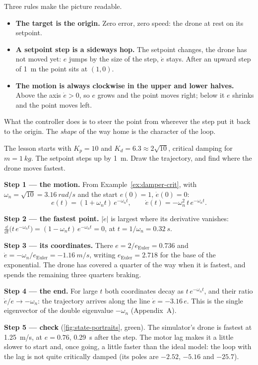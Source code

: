 Three rules make the picture readable.
\begin{itemize}
  \item \textbf{The target is the origin.} Zero error, zero speed: the drone at rest on its setpoint.
  \item \textbf{A setpoint step is a sideways hop.} The setpoint changes, the drone has not moved yet: $e$ jumps by the size of the step, $\dot e$ stays. After an upward step of \SI{1}{m} the point sits at $(1, 0)$.
  \item \textbf{The motion is always clockwise in the upper and lower halves.} Above the axis $\dot e > 0$, so $e$ grows and the point moves right; below it $e$ shrinks and the point moves left.
\end{itemize}

What the controller does is to steer the point from wherever the step put it back to the origin. The \emph{shape} of the way home is the character of the loop.

\begin{example}
\label{ex:state-crit}
The lesson starts with $K_p = 10$ and $K_d = 6.3 \approx 2\sqrt{10}$, critical damping for $m = \SI{1}{kg}$. The setpoint steps up by \SI{1}{m}. Draw the trajectory, and find where the drone moves fastest.

\textbf{Step 1 — the motion.} From Example~\ref{ex:damper-crit}, with $\omega_n = \sqrt{10} = \SI{3.16}{rad/s}$ and the start $e(0) = 1$, $\dot e(0) = 0$:
\begin{equation*}
  e(t) = (1 + \omega_nt)\,e^{-\omega_nt}, \qquad \dot e(t) = -\omega_n^2\,t\,e^{-\omega_nt} .
\end{equation*}

\textbf{Step 2 — the fastest point.} $|\dot e|$ is largest where its derivative vanishes: $\frac{\dd}{\dd t}\big(t\,e^{-\omega_nt}\big) = (1 - \omega_nt)\,e^{-\omega_nt} = 0$, at $t = 1/\omega_n = \SI{0.32}{s}$.

\textbf{Step 3 — its coordinates.} There $e = 2/e_{\mathrm{Euler}} = 0.736$ and $\dot e = -\omega_n/e_{\mathrm{Euler}} = \SI{-1.16}{m/s}$, writing $e_{\mathrm{Euler}} = 2.718$ for the base of the exponential. The drone has covered a quarter of the way when it is fastest, and spends the remaining three quarters braking.

\textbf{Step 4 — the end.} For large $t$ both coordinates decay as $t\,e^{-\omega_nt}$, and their ratio $\dot e/e \to -\omega_n$: the trajectory arrives along the line $\dot e = -3.16\,e$. This is the single eigenvector of the double eigenvalue $-\omega_n$ (Appendix~A).

\textbf{Step 5 — check} (\cref{fig:state-portraits}, green). The simulator's drone is fastest at \SI{1.25}{m/s}, at $e = 0.76$, \SI{0.29}{s} after the step. The motor lag makes it a little slower to start and, once going, a little faster than the ideal model: the loop with the lag is not quite critically damped (its poles are $-2.52$, $-5.16$ and $-25.7$).
\end{example}


